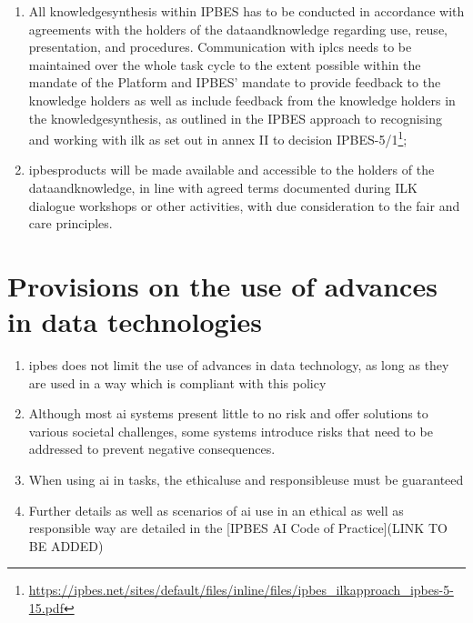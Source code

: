 \documentclass{article}
\begin{document}
\begin{enumerate}[label=(\alph*)]
    \item All \gls{knowledgesynthesis} within IPBES has to be conducted in accordance with agreements with the holders of the \gls{dataandknowledge} regarding use, reuse, presentation, and procedures. Communication with \glspl{iplc} needs to be maintained over the whole \gls{task} cycle to the extent possible within the mandate of the Platform and IPBES’ mandate to provide feedback to the \gls{knowledge} holders as well as include feedback from the \gls{knowledge} holders in the \gls{knowledgesynthesis}, as outlined in the IPBES approach to recognising and working with \gls{ilk} as set out in annex II to decision IPBES-5/1\footnote{\href{https://ipbes.net/sites/default/files/inline/files/ipbes_ilkapproach_ipbes-5-15.pdf}{https://ipbes.net/sites/default/files/inline/files/ipbes\_ilkapproach\_ipbes-5-15.pdf}};

    \item \glspl{ipbesproduct} will be made available and \gls{accessible} to the holders of the \gls{dataandknowledge}, in line with agreed terms documented during ILK dialogue workshops or other activities, with due consideration to the \gls{fair} and \gls{care} principles.
\end{enumerate}

\section{Provisions on the use of advances in data technologies}
\begin{enumerate}[label=(\alph*)]
    \item \gls{ipbes} does not limit the use of advances in data technology, as long as they are used in a way which is compliant with this policy
    \item Although most \gls{ai} systems present little to no risk and offer solutions to various societal challenges, some systems introduce risks that need to be addressed to prevent negative consequences.
    \item When using \gls{ai} in \glspl{task}, the \gls{ethicaluse} and \gls{responsibleuse} must be guaranteed
    \item Further details as well as scenarios of \gls{ai} use in an ethical as well as responsible way are detailed in the [IPBES AI Code of Practice](LINK TO BE ADDED)
\end{enumerate}




\appendix
\end{document}
